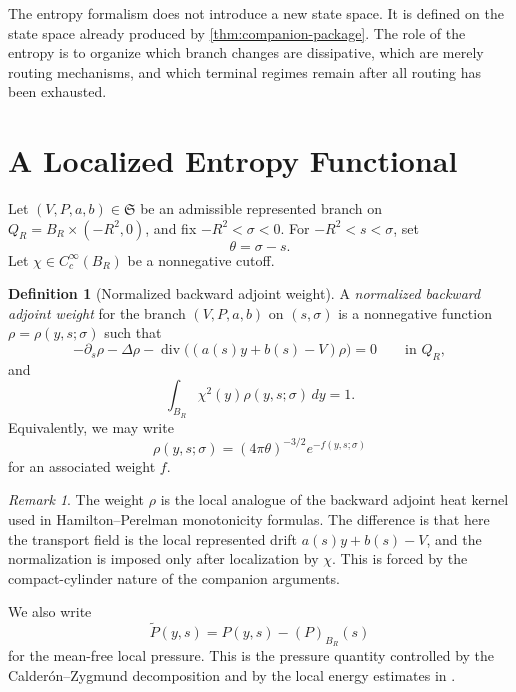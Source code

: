 \documentclass[11pt]{amsart}
\numberwithin{equation}{section}
\theoremstyle{plain}
\theoremstyle{definition}
\newtheorem{definition}[theorem]{Definition}
\theoremstyle{remark}
\newtheorem{remark}[theorem]{Remark}
\newcommand{\State}{\mathfrak S}
\newcommand{\diver}{\operatorname{div}}
\begin{document}
The entropy formalism does not introduce a new state space.  It is defined on
the state space already produced by \cref{thm:companion-package}.  The role of
the entropy is to organize which branch changes are dissipative, which are
merely routing mechanisms, and which terminal regimes remain after all routing
has been exhausted.

\section{A Localized Entropy Functional}
\label{sec:functional}

Let \((V,P,a,b)\in\State\) be an admissible represented branch on
\(Q_R=B_R\times(-R^2,0)\), and fix \(-R^2<\sigma<0\).  For
\(-R^2<s<\sigma\), set
\[
	\theta=\sigma-s.
\]
Let \(\chi\in C_c^\infty(B_R)\) be a nonnegative cutoff.

\begin{definition}[Normalized backward adjoint weight]
\label{def:adjoint-weight}
A \emph{normalized backward adjoint weight} for the branch
\((V,P,a,b)\) on \((s,\sigma)\) is a nonnegative function
\(\rho=\rho(y,s;\sigma)\) such that
\begin{equation}\label{eq:adjoint-rho}
	-\partial_s\rho-\Delta\rho-\diver\bigl((a(s)y+b(s)-V)\rho\bigr)=0
	\qquad\text{in }Q_R,
\end{equation}
and
\begin{equation}\label{eq:rho-normalization}
	\int_{B_R}\chi^2(y)\rho(y,s;\sigma)\,dy=1.
\end{equation}
Equivalently, we may write
\begin{equation}\label{eq:rho-f}
	\rho(y,s;\sigma)=(4\pi\theta)^{-3/2}e^{-f(y,s;\sigma)}
\end{equation}
for an associated weight \(f\).
\end{definition}

\begin{remark}
The weight \(\rho\) is the local analogue of the backward adjoint heat kernel
used in Hamilton--Perelman monotonicity formulas.  The difference is that here
the transport field is the local represented drift \(a(s)y+b(s)-V\), and the
normalization is imposed only after localization by \(\chi\).  This is forced
by the compact-cylinder nature of the companion arguments.
\end{remark}

We also write
\begin{equation}\label{eq:pressure-tilde}
	\widetilde P(y,s)=P(y,s)-(P)_{B_R}(s)
\end{equation}
for the mean-free local pressure.  This is the pressure quantity controlled by
the Calder\'on--Zygmund decomposition and by the local energy estimates in
\cite{BallesterTypeII}.
\end{document}
